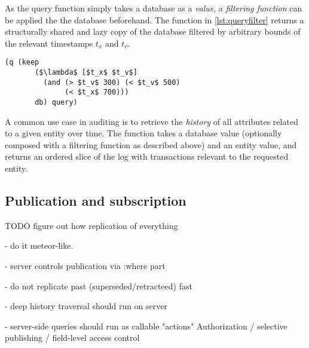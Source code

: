 As the query function simply takes a database as a \emph{value}, a \emph{filtering function} can be applied the the database beforehand. The  function in \autoref{lst:queryfilter} returns a structurally shared and lazy copy of the database filtered by arbitrary bounds of the relevant timestamps $t_x$ and $t_v$.

\begin{lstlisting}[label={lst:queryfilter},caption=Applying a temporal filter before querying,morekeywords={keep,q,<,>}]
  (q (keep
       ($\lambda$ [$t_x$ $t_v$]
         (and (> $t_v$ 300) (< $t_v$ 500)
              (< $t_x$ 700)))
       db) query)
  \end{lstlisting}


A common use case in auditing is to retrieve the \emph{history} of all attributes related to a given entity over time. The  function takes a database value (optionally composed with a filtering function as described above) and an entity value, and returns an ordered slice of the log with transactions relevant to the requested entity.



\subsection{Publication and subscription}

TODO figure out how replication of everything

- do it meteor-like.

- server controls publication via :where part

- do not replicate past (superseded/retracteed) fast

- deep history traversal should run on server

- server-side queries should run as callable "actions"
Authorization / selective publishing / field-level access control
